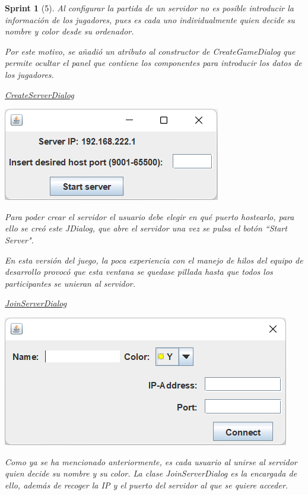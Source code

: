 \documentclass[12pt,a4paper,openright]{book}
\theoremstyle{break}
\newtheorem*{sprint}{Sprint}
\begin{document}
\begin{sprint}[5]
Al configurar la partida de un servidor no es posible introducir la información de los jugadores, pues es cada uno individualmente quien decide su nombre y color desde su ordenador.

Por este motivo, se añadió un atributo al constructor de \textit{CreateGameDialog} que permite ocultar el panel que contiene los componentes para introducir los datos de los jugadores.

\underline{CreateServerDialog}
\begin{center}
\includegraphics[scale=0.8]{create-server-sprint5.png}
\end{center}

Para poder crear el servidor el usuario debe elegir en qué puerto hostearlo, para ello se creó este \textit{JDialog}, que abre el servidor una vez se pulsa el botón ``Start Server".

En esta versión del juego, la poca experiencia con el manejo de hilos del equipo de desarrollo provocó que esta ventana se quedase pillada hasta que todos los participantes se unieran al servidor.

\underline{JoinServerDialog}
\begin{center}
\includegraphics[scale=0.8]{join-server-sprint5.png}
\end{center}

Como ya se ha mencionado anteriormente, es cada usuario al unirse al servidor quien decide su nombre y su color. La clase \textit{JoinServerDialog} es la encargada de ello, además de recoger la IP y el puerto del servidor al que se quiere acceder.


\end{sprint}
\end{document}

